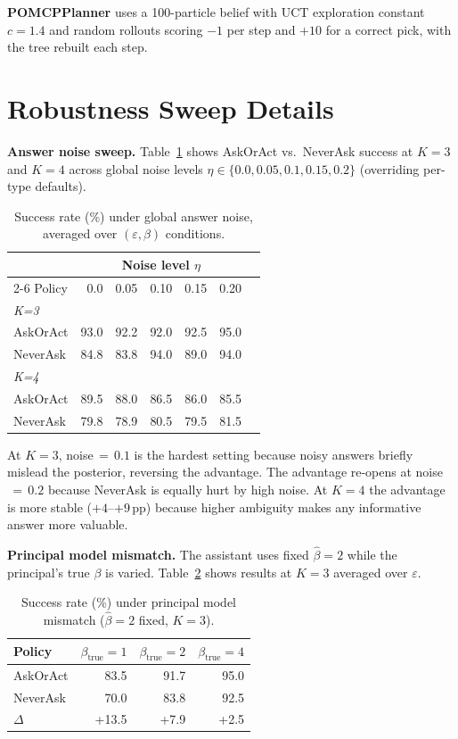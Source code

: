 \documentclass[10pt,twocolumn]{article}
\begin{document}
\textbf{POMCPPlanner} uses a 100-particle belief with UCT exploration constant $c{=}1.4$ and random rollouts scoring $-1$ per step and $+10$ for a correct pick, with the tree rebuilt each step.

\section{Robustness Sweep Details}
\label{app:robustness}

\textbf{Answer noise sweep.}
Table~\ref{tab:noise_sweep} shows AskOrAct vs.\ NeverAsk success at $K{=}3$ and $K{=}4$ across global noise levels $\eta \in \{0.0, 0.05, 0.1, 0.15, 0.2\}$ (overriding per-type defaults).

\begin{table}[h]
\centering
\caption{Success rate (\%) under global answer noise, averaged over $(\varepsilon,\beta)$ conditions.}
\label{tab:noise_sweep}
\small
\begin{tabular}{lrrrrrr}
\toprule
 & \multicolumn{5}{c}{Noise level $\eta$} \\
\cmidrule(lr){2-6}
Policy & 0.0 & 0.05 & 0.10 & 0.15 & 0.20 \\
\midrule
\multicolumn{6}{l}{\textit{K=3}} \\
AskOrAct & 93.0 & 92.2 & 92.0 & 92.5 & 95.0 \\
NeverAsk  & 84.8 & 83.8 & 94.0 & 89.0 & 94.0 \\
\midrule
\multicolumn{6}{l}{\textit{K=4}} \\
AskOrAct & 89.5 & 88.0 & 86.5 & 86.0 & 85.5 \\
NeverAsk  & 79.8 & 78.9 & 80.5 & 79.5 & 81.5 \\
\bottomrule
\end{tabular}
\end{table}

At $K{=}3$, noise$\,{=}\,0.1$ is the hardest setting because noisy answers briefly mislead the posterior, reversing the advantage.
The advantage re-opens at noise$\,{=}\,0.2$ because NeverAsk is equally hurt by high noise.
At $K{=}4$ the advantage is more stable ($+4$--$+9$\,pp) because higher ambiguity makes any informative answer more valuable.

\textbf{Principal model mismatch.}
The assistant uses fixed $\hat\beta{=}2$ while the principal's true $\beta$ is varied.
Table~\ref{tab:mismatch} shows results at $K{=}3$ averaged over $\varepsilon$.

\begin{table}[h]
\centering
\caption{Success rate (\%) under principal model mismatch ($\hat\beta{=}2$ fixed, $K{=}3$).}
\label{tab:mismatch}
\small
\begin{tabular}{lrrr}
\toprule
Policy & $\beta_{\text{true}}{=}1$ & $\beta_{\text{true}}{=}2$ & $\beta_{\text{true}}{=}4$ \\
\midrule
AskOrAct  & 83.5 & 91.7 & 95.0 \\
NeverAsk  & 70.0 & 83.8 & 92.5 \\
$\Delta$  & +13.5 & +7.9 & +2.5 \\
\bottomrule
\end{tabular}
\end{table}
\end{document}
